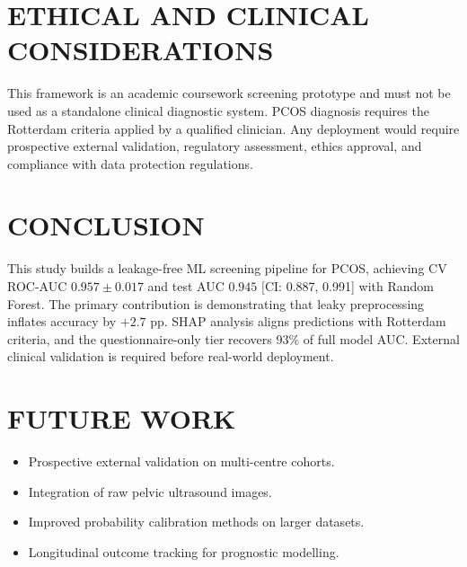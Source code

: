 \documentclass[10pt,twocolumn,a4paper]{article}
\begin{document}
\section{ETHICAL AND CLINICAL CONSIDERATIONS}

This framework is an academic coursework screening prototype and must not be used as a standalone clinical diagnostic system.
PCOS diagnosis requires the Rotterdam criteria applied by a qualified clinician.  Any deployment would require prospective
external validation, regulatory assessment, ethics approval, and compliance with data protection regulations.

\section{CONCLUSION}

This study builds a leakage-free ML screening pipeline for PCOS, achieving CV ROC-AUC $0.957 \pm 0.017$ and test AUC $0.945$
[CI: 0.887, 0.991] with Random Forest.  The primary contribution is demonstrating that leaky preprocessing inflates accuracy by $+2.7$ pp.
SHAP analysis aligns predictions with Rotterdam criteria, and the questionnaire-only tier recovers 93\% of full model AUC.
External clinical validation is required before real-world deployment.

\section{FUTURE WORK}

\begin{itemize}[leftmargin=*,topsep=2pt,itemsep=2pt]
\item Prospective external validation on multi-centre cohorts.
\item Integration of raw pelvic ultrasound images.
\item Improved probability calibration methods on larger datasets.
\item Longitudinal outcome tracking for prognostic modelling.
\end{itemize}
\end{document}
